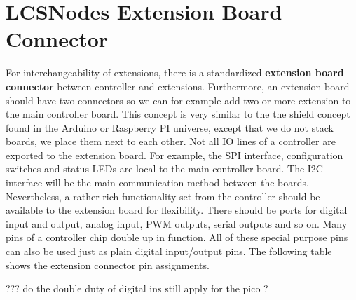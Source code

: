 \section{LCSNodes Extension Board Connector}

For interchangeability of extensions, there is a standardized \textbf{extension board connector} between controller and extensions. Furthermore, an extension board should have two connectors so we can for example add two or more extension to the main controller board. This concept is very similar to the the shield concept found in the Arduino or Raspberry PI universe, except that we do not stack boards, we place them next to each other. Not all IO lines of a controller are exported to the extension board. For example, the SPI interface, configuration switches and status LEDs are local to the main controller board. The I2C interface will be the main communication method between the boards. Nevertheless, a rather rich functionality set from the controller should be available to the extension board for flexibility. There should be ports for digital input and output, analog input, PWM outputs, serial outputs and so on. Many pins of a controller chip double up in function. All of these special purpose pins can also be used just as plain digital input/output pins. The following table shows the extension connector pin assignments.

??? do the double duty of digital ins still apply for the pico ?

